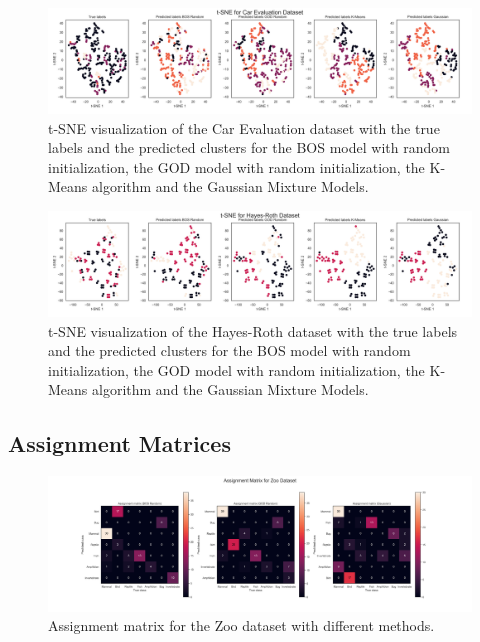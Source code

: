\begin{figure}[H]
    \centering
    \includegraphics[width=\textwidth]{python_figures/tsne_car_evaluation.png}
    \caption{t-SNE visualization of the Car Evaluation dataset with the true labels and the predicted clusters for the BOS model with random initialization, the GOD model with random initialization, the K-Means algorithm and the Gaussian Mixture Models.}
    \label{fig:tsne_car}
\end{figure}

\begin{figure}[H]
    \centering
    \includegraphics[width=\textwidth]{python_figures/tsne_hayes-roth.png}
    \caption{t-SNE visualization of the Hayes-Roth dataset with the true labels and the predicted clusters for the BOS model with random initialization, the GOD model with random initialization, the K-Means algorithm and the Gaussian Mixture Models.}
    \label{fig:tsne_hr}
\end{figure}


\subsection{Assignment Matrices}
\label{sec:appendix_assign}

\begin{figure}[H]
    \centering
    \includegraphics[width=\linewidth]{python_figures/assignment_matrix_zoo.png}
    \caption{Assignment matrix for the Zoo dataset with different methods.}
    \label{fig:assign_zoo}
\end{figure}

